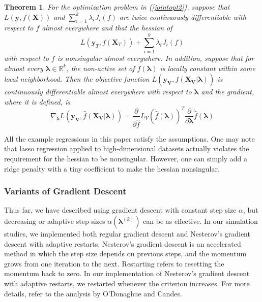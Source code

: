 \documentclass[10pt,letterpaper]{article}
\newtheorem{theorem}{Theorem}
\begin{document}

\begin{theorem}
For the optimization problem in (\ref{jointopt2}), suppose that $L(\boldsymbol{y}, f(\boldsymbol{X}))$ and
$\sum\limits_{i=1}^k \lambda_i J_i(f)$ are twice continuously differentiable with respect to $f$ almost everywhere and that the hessian of
\begin{equation}
L(\boldsymbol{y}_T, f (\boldsymbol{X}_T)) + \sum\limits_{i=1}^k \lambda_i J_i(f)
\end{equation}
with respect to $f$ is nonsingular almost everywhere. In addition, suppose that for almost every $\boldsymbol{\lambda} \in \mathbb{R}^k$, the non-active set of $\hat f(\boldsymbol{\lambda})$ is locally constant within some local neighborhood. Then the objective function $L(\boldsymbol{y_V}, \hat f(\boldsymbol{X_V} | \boldsymbol{\lambda}))$ is continuously differentiable almost everywhere with respect to $\boldsymbol{\lambda}$ and the gradient, where it is defined, is
\begin{equation}
\nabla_{\boldsymbol{\lambda}} L(\boldsymbol{y_V}, \hat f(\boldsymbol{X_V} | \boldsymbol{\lambda})) = \frac{\partial}{\partial \dot{\hat{f}}} L_V(\dot{\hat{f}}(\boldsymbol{\lambda}))^T \frac{\partial}{\partial \boldsymbol{\lambda}} \dot{\hat{f}}(\boldsymbol{\lambda})
\end{equation}

\label{thethrm}
\end{theorem}

All the example regressions in this paper satisfy the assumptions. One may note that lasso regression applied to high-dimensional datasets actually violates the requirement for the hessian to be nonsingular. However, one can simply add a ridge penalty with a tiny coefficient to make the hessian nonsingular.

\subsubsection{Variants of Gradient Descent}

Thus far, we have described using gradient descent with constant step size $\alpha$, but decreasing or adaptive step sizes $\alpha(\boldsymbol{\lambda}^{(k)})$ can be as effective. In our simulation studies, we implemented both regular gradient descent and Nesterov's gradient descent with adaptive restarts. Nesterov's gradient descent is an accelerated method in which the step size depends on previous steps, and the momentum grows from one iteration to the next. Restarting refers to resetting the momentum back to zero. In our implementation of Nesterov's gradient descent with adaptive restarts, we restarted whenever the criterion increases. For more details, refer to the analysis by O'Donaghue and Candes.
\end{document}
